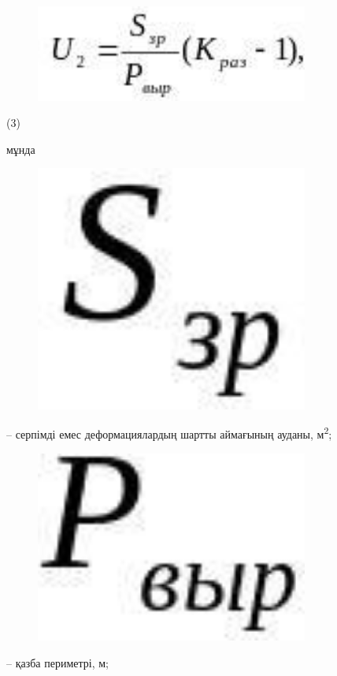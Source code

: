 \begin{figure}[H]
	\centering
	\includegraphics[width=0.8\textwidth]{assets/1270}
	\caption*{}
\end{figure} (3)

мұнда \begin{figure}[H]
	\centering
	\includegraphics[width=0.8\textwidth]{assets/1271}
	\caption*{}
\end{figure}-- серпімді емес
деформациялардың шартты аймағының ауданы, м\textsuperscript{2};

\begin{figure}[H]
	\centering
	\includegraphics[width=0.8\textwidth]{assets/1272}
	\caption*{}
\end{figure}-- қазба периметрі, м;

